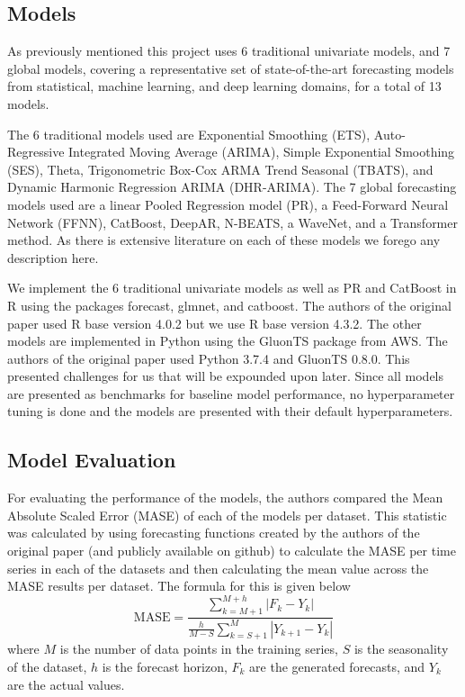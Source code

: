 \subsection{Models}
As previously mentioned this project uses 6 traditional univariate models, and 7 global models, covering a representative set of state-of-the-art forecasting models from statistical, machine learning, and deep learning domains, for a total of 13 models.

The 6 traditional models used are Exponential Smoothing (ETS), Auto-Regressive Integrated Moving Average (ARIMA), Simple Exponential Smoothing
(SES), Theta, Trigonometric Box-Cox ARMA Trend Seasonal (TBATS), and Dynamic Harmonic Regression ARIMA (DHR-ARIMA). The 7 global forecasting models used are a linear Pooled Regression model (PR), a Feed-Forward Neural Network (FFNN), CatBoost, DeepAR, N-BEATS, a WaveNet, and a Transformer method. As there is extensive literature on each of these models we forego any description here. 

We implement the 6 traditional univariate models as well as PR and CatBoost in R using the packages forecast, glmnet, and catboost. The authors of the original paper used R base version 4.0.2 but we use R base version 4.3.2. The other models are implemented in Python using the GluonTS package from AWS. The authors of the original paper used Python 3.7.4 and GluonTS 0.8.0. This presented challenges for us that will be expounded upon later. Since all models are presented as benchmarks for baseline model performance, no hyperparameter tuning is done and the models are presented with their default hyperparameters. 

\subsection{Model Evaluation}
For evaluating the performance of the models, the authors compared the Mean Absolute Scaled Error (MASE) of each of the models per dataset. This statistic was calculated by using forecasting functions created by the authors of the original paper (and publicly available on github) to calculate the MASE per time series in each of the datasets and then calculating the mean value across the MASE results per dataset. The formula for this is given below $$\text{MASE}=\frac{\sum_{k=M+1}^{M+h} |F_k-Y_k|}{\frac{h}{M-S}\sum_{k=S+1}^{M} |Y_{k+1}-Y_k|}$$
where $M$ is the number of data points in the training series, $S$ is the seasonality of the dataset, $h$ is the forecast horizon, $F_k$ are the generated forecasts, and $Y_k$ are the actual values. 

